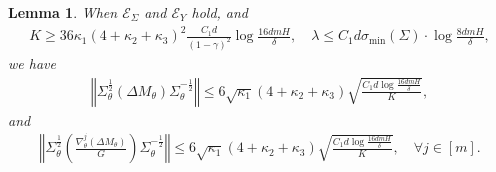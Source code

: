 \documentclass{article}
\newtheorem{lemma}{Lemma}[section]
\numberwithin{equation}{section}
\begin{document}
\begin{lemma}
\label{dm2_homo}
When $\mathcal{E}_\Sigma$ and $\mathcal{E}_Y$ hold, and
\begin{align*}
    K\geq 36\kappa_1(4+\kappa_2+\kappa_3)^2\frac{C_1d}{(1-\gamma)^2}\log\frac{16dmH}{\delta},\quad\lambda\leq C_1d\sigma_{\textrm{min}}(\Sigma)\cdot\log\frac{8dmH}{\delta},
\end{align*}
we have
\begin{align*}
    \left\Vert\Sigma_\theta^{\frac{1}{2}}\left(\Delta M_\theta\right)\Sigma_\theta^{-\frac{1}{2}}\right\Vert\leq 6\sqrt{\kappa_1}(4+\kappa_2+\kappa_3)\sqrt{\frac{C_1d\log\frac{16dmH}{\delta}}{K}},
\end{align*}
and
\begin{align*}
    \left\Vert\Sigma_\theta^{\frac{1}{2}}\left(\frac{\nabla_\theta^j\left(\Delta M_\theta\right)}{G}\right)\Sigma_\theta^{-\frac{1}{2}}\right\Vert\leq 6\sqrt{\kappa_1}(4+\kappa_2+\kappa_3)\sqrt{\frac{C_1d\log\frac{16dmH}{\delta}}{K}},\quad\forall j\in[m].
\end{align*}
\end{lemma}
\end{document}
